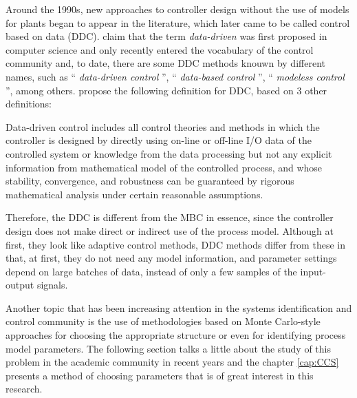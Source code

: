 Around the 1990s, new approaches to controller design without the use of models for plants began to appear in the literature, which later came to be called control based on data (DDC).
%
\cite{hou2013} claim that the term \emph{data-driven} was first proposed in computer science and only recently entered the vocabulary of the control community and, to date, there are some DDC methods knouwn by different names, such as `` \emph{data-driven control} '', `` \emph{data-based control} '', `` \emph{modeless control} '', among others. \cite{hou2013} propose the following definition for DDC, based on 3 other definitions:


\begin{defn}\citep{hou2013}
Data-driven control includes all control theories and methods in which the controller is designed by directly using on-line or off-line I/O data of the controlled system or knowledge from the data processing but not any explicit information from mathematical model of the controlled process, and whose stability, convergence, and robustness can be guaranteed by rigorous mathematical analysis under certain reasonable assumptions.
\end{defn}

Therefore, the DDC is different from the MBC in essence, since the controller design does not make direct or indirect use of the process model.  
Although at first, they look like adaptive control methods, DDC methods differ from these in that, at first, they do not need any model information, and parameter settings depend on large batches of data, instead of only a few samples of the input-output signals. %

Another topic that has been increasing attention in the systems identification and control community is the use of methodologies based on Monte Carlo-style approaches for choosing the appropriate structure or even for identifying process model parameters. The following section talks a little about the study of this problem in the academic community in recent years and the chapter \ref{cap:CCS} presents a method of choosing parameters that is of great interest in this research.

